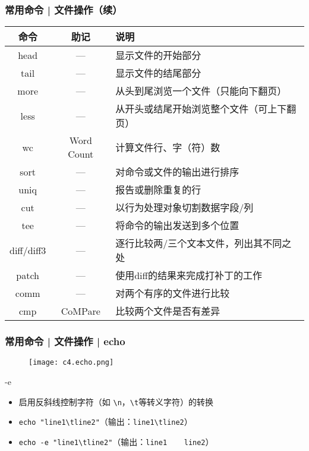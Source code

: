 \begin{frame}
  \frametitle{常用命令 | \alert{文件操作（续）}}
  \begin{table}
    \centering
    \begin{tabularx}{\textwidth}{ccX}
      \hline
      \rowcolor{blue!50}命令 & 助记 & 说明\\
      \hline
      head & --- & 显示文件的开始部分\\
      tail & --- & 显示文件的结尾部分\\
      more & --- & 从头到尾浏览一个文件（只能向下翻页）\\
      less & --- & \footnotesize{从开头或结尾开始浏览整个文件（可上下翻页）}\\
      wc & Word Count & 计算文件行、字（符）数\\
      sort & --- & 对命令或文件的输出进行排序\\
      uniq & --- & 报告或删除重复的行\\
      cut & --- & 以行为处理对象切割数据字段/列\\
      tee & --- & 将命令的输出发送到多个位置\\
      diff/diff3 & --- & 逐行比较两/三个文本文件，列出其不同之处\\
      patch & --- & 使用diff的结果来完成打补丁的工作\\
      comm & --- & 对两个有序的文件进行比较\\
      cmp & CoMPare & 比较两个文件是否有差异\\
      \hline
    \end{tabularx}
  \end{table}
\end{frame}

\begin{frame}[fragile]
  \frametitle{常用命令 | 文件操作 | echo}
  \begin{figure}
    \centering
    \texttt{[image: c4.echo.png]}
  \end{figure}
  \pause
  \begin{block}{\alert{-e}}
    \begin{itemize}
      \item 启用反斜线控制字符（如 \verb|\n|，\verb|\t|等转义字符）的转换
      \item \verb|echo "line1\tline2"|（输出：\verb|line1\tline2|）
      \item \verb|echo -e "line1\tline2"|（输出：\verb|line1    line2|）
    \end{itemize}
  \end{block}
\end{frame}

